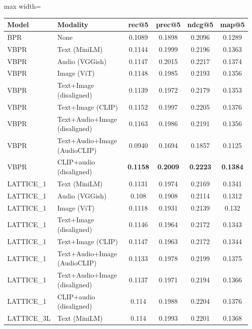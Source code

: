 \begin{table}[H]
    \centering
    \begin{adjustbox}{max width=\textwidth}
    \begin{tabular}{|l|l|c|c|c|c|}
    \hline
    	\textbf{Model} & \textbf{Modality} & \textbf{rec@5} & \textbf{prec@5} & \textbf{ndcg@5} & \textbf{map@5} \\
    \hline
    BPR & None & 0.1089 & 0.1898 & 0.2096 & 0.1289 \\
    \hline
    VBPR & Text (MiniLM) & 0.1144 & 0.1999 & 0.2196 & 0.1363 \\
    \hline
    VBPR & Audio (VGGish) & 0.1147 & 0.2015 & 0.2217 & 0.1374 \\
    \hline
    VBPR & Image (ViT) & 0.1148 & 0.1985 & 0.2193 & 0.1356 \\
    \hline
    VBPR & Text+Image (disaligned) & 0.1139 & 0.1972 & 0.2179 & 0.1353 \\
    \hline
    VBPR & Text+Image (CLIP) & 0.1152 & 0.1997 & 0.2205 & 0.1376 \\
    \hline
    VBPR & Text+Audio+Image (disaligned) & 0.1163 & 0.1986 & 0.2191 & 0.1356 \\
    \hline
    VBPR & Text+Audio+Image (AudioCLIP) & 0.0940 & 0.1694 & 0.1857 & 0.1125 \\
    \hline
    VBPR & CLIP+audio (disaligned) & \textbf{0.1158} & \textbf{0.2009} & \textbf{0.2223} & \textbf{0.1384} \\
    \hline
    LATTICE\_1 & Text (MiniLM) & 0.1131 & 0.1974 & 0.2169 & 0.1341 \\
    \hline
    LATTICE\_1 & Audio (VGGish) & 0.108 & 0.1908 & 0.2114 & 0.1312 \\
    \hline
    LATTICE\_1 & Image (ViT) & 0.1118 & 0.1931 & 0.2139 & 0.132 \\
    \hline
    LATTICE\_1 & Text+Image (disaligned) & 0.1146 & 0.1964 & 0.2172 & 0.1343 \\
    \hline
    LATTICE\_1 & Text+Image (CLIP) & 0.1147 & 0.1963 & 0.2172 & 0.1344 \\
    \hline
    LATTICE\_1 & Text+Audio+Image (AudioCLIP) & 0.1133 & 0.1978 & 0.2199 & 0.1375 \\
    \hline
    LATTICE\_1 & Text+Audio+Image (disaligned) & 0.1137 & 0.1971 & 0.2194 & 0.1366 \\
    \hline
    LATTICE\_1 & CLIP+audio (disaligned) & 0.114 & 0.1988 & 0.2204 & 0.1376 \\
    \hline
    LATTICE\_3L & Text (MiniLM) & 0.114 & 0.1993 & 0.2201 & 0.1368 \\

\end{tabular}
\end{adjustbox}
\end{table}
